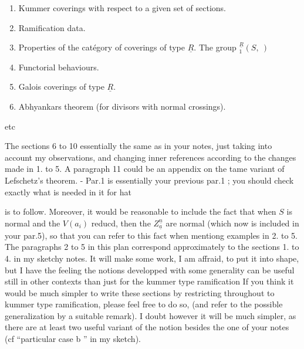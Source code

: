 \begin{enumerate}[label={}]
\item[1.] Kummer coverings with respect to a given set of sections.
\item[2.] Ramification data.
\reversemarginpar
{}
\normalmarginpar
\item[3.] Properties of the catégory of coverings of type $\underline{R}$. The group ${}_{1}^{\underline{R}}(S,\ )$
\item[4.] Functorial behaviours.
\item[5.] Galois coverings of type $\underline{R}$.
\item[6.] Abhyankars theorem (for divisors with normal crossings).
\end{enumerate}
etc

The sections 6 to 10 essentially the same as in your notes, just taking into account my observations, and changing inner references according to the changes made in 1. to 5. A paragraph 11 could be an appendix on the tame variant of Lefschetz's theorem. - Par.1 is essentially your previous par.1 ; you should check exactly what is needed in it for hat

is to follow. Moreover, it would be reasonable to include the fact that when
$S$ is normal and the $V(a_i)$ reducd,
then the $Z^{\underline{n}}_{\underline{a}}$ are normal (which now is included
in your par.5), so that you can refer to this fact when
mentiong
examples in  2. to 5. The paragraphs 2 to 5
in this plan correspond approximately to the sections 1. to 4. in my sketchy
notes. It will make some work, I am affraid, to put it into shape, but I have
the feeling the notions developped with some generality can be useful still
in other contexts than just for the kummer type ramification %
If you think it would be much simpler to write these sections by restricting
throughout to kummer type ramification, please feel free to do so, (and refer
to the possible generalization by a suitable remark). I doubt however it will
be much simpler, as there are at least two useful variant %
of the notion besides the one of your notes (cf ``particular case b '' in my
sketch).

